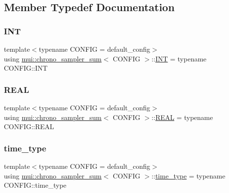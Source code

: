 \subsection{Member Typedef Documentation}
\mbox{\label{classmui_1_1chrono__sampler__sum_a40d6bae882beef550b2e2315dc91af92}} 
\subsubsection{\texorpdfstring{I\+NT}{INT}}
{\footnotesize\ttfamily template$<$typename C\+O\+N\+F\+IG  = default\+\_\+config$>$ \\
using \hyperlink{classmui_1_1chrono__sampler__sum}{mui\+::chrono\+\_\+sampler\+\_\+sum}$<$ C\+O\+N\+F\+IG $>$\+::\hyperlink{classmui_1_1chrono__sampler__sum_a40d6bae882beef550b2e2315dc91af92}{I\+NT} =  typename C\+O\+N\+F\+I\+G\+::\+I\+NT}

\mbox{\label{classmui_1_1chrono__sampler__sum_a899d123aab70426cddf903d1e7c7b888}} 
\subsubsection{\texorpdfstring{R\+E\+AL}{REAL}}
{\footnotesize\ttfamily template$<$typename C\+O\+N\+F\+IG  = default\+\_\+config$>$ \\
using \hyperlink{classmui_1_1chrono__sampler__sum}{mui\+::chrono\+\_\+sampler\+\_\+sum}$<$ C\+O\+N\+F\+IG $>$\+::\hyperlink{classmui_1_1chrono__sampler__sum_a899d123aab70426cddf903d1e7c7b888}{R\+E\+AL} =  typename C\+O\+N\+F\+I\+G\+::\+R\+E\+AL}

\mbox{\label{classmui_1_1chrono__sampler__sum_ada1a39bc0845e79c00e7aed8b55e8fb2}} 
\subsubsection{\texorpdfstring{time\+\_\+type}{time\_type}}
{\footnotesize\ttfamily template$<$typename C\+O\+N\+F\+IG  = default\+\_\+config$>$ \\
using \hyperlink{classmui_1_1chrono__sampler__sum}{mui\+::chrono\+\_\+sampler\+\_\+sum}$<$ C\+O\+N\+F\+IG $>$\+::\hyperlink{classmui_1_1chrono__sampler__sum_ada1a39bc0845e79c00e7aed8b55e8fb2}{time\+\_\+type} =  typename C\+O\+N\+F\+I\+G\+::time\+\_\+type}



